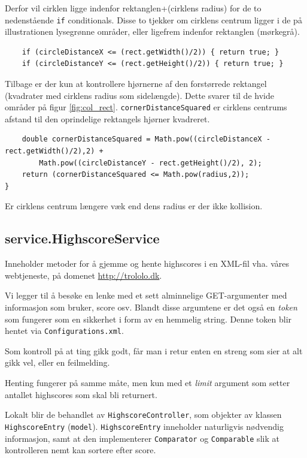 \documentclass[titlepage,danish]{article}
\newcommand{\code}[1]{\texttt{#1}}
\begin{document}
Derfor vil cirklen ligge indenfor rektanglen+(cirklens radius) for de to nedenstående \code{if}
conditionals. Disse to tjekker om cirklens centrum ligger i de på illustrationen lysegrønne områder,
eller ligefrem indenfor rektanglen (mørkegrå).
\begin{verbatim}
    if (circleDistanceX <= (rect.getWidth()/2)) { return true; } 
    if (circleDistanceY <= (rect.getHeight()/2)) { return true; }
\end{verbatim}	    
Tilbage er der kun at kontrollere hjørnerne af den forstørrede rektangel (kvadrater med cirklens
radius som sidelængde). Dette svarer til de hvide områder på figur \ref{fig:col_rect}.
\code{cornerDistanceSquared} er cirklens centrums afstand til den oprindelige rektangels hjørner
kvadreret.
\begin{verbatim}
    double cornerDistanceSquared = Math.pow((circleDistanceX - rect.getWidth()/2),2) + 
        Math.pow((circleDistanceY - rect.getHeight()/2), 2);
    return (cornerDistanceSquared <= Math.pow(radius,2));
}
\end{verbatim}
Er cirklens centrum længere væk end dens radius er der ikke kollision.


\subsection{service.HighscoreService}

Inneholder metoder for å gjemme og hente highscores i en XML-fil vha. våres webtjeneste, på domenet
\url{http://trololo.dk}.

Vi legger til å besøke en lenke med et sett alminnelige GET-argumenter med informasjon som bruker,
score osv. Blandt disse argumtene er det også en \emph{token} som fungerer som en sikkerhet i form
av en hemmelig string. Denne token blir hentet via \code{Configurations.xml}.

Som kontroll på at ting gikk godt, får man i retur enten en streng som sier at alt gikk vel, eller
en feilmelding.

Henting fungerer på samme måte, men kun med et \emph{limit} argument som setter antallet highscores
som skal bli returnert.

Lokalt blir de behandlet av \code{HighscoreController}, som objekter av klassen
\code{HighscoreEntry} (\code{model}). \code{HighscoreEntry} inneholder naturligvis nødvendig
informasjon, samt at den implementerer \code{Comparator} og \code{Comparable} slik at kontrolleren
nemt kan sortere efter score.
\end{document}
